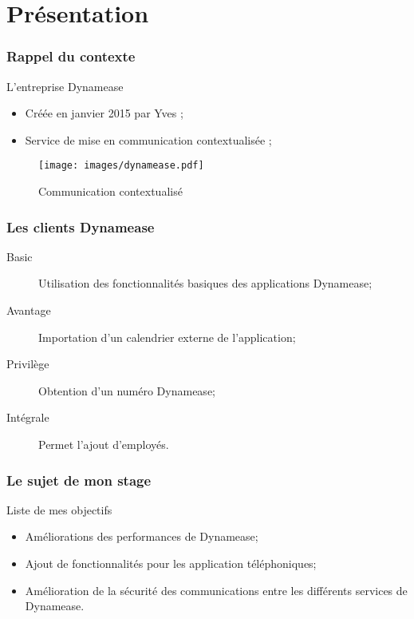 \section{Présentation}
\author{Kévin Moreau}


\begin{frame}
	\frametitle{Rappel du contexte}

	\begin{block}{L'entreprise Dynamease}
	 \begin{itemize}
      \item Créée en janvier 2015 par Yves  ;
	  \item Service de mise en communication contextualisée ;
	 \end{itemize}
	\end{block}

    \begin{center}
	  \begin{figure}
        \texttt{[image: images/dynamease.pdf]}
	   \caption{Communication contextualisé}
	  \end{figure}
	\end{center}
\end{frame}

\begin{frame}
	\frametitle{Les clients Dynamease}

    \begin{description}
    	\item[Basic] Utilisation des fonctionnalités basiques des applications Dynamease;
    	\item[Avantage] Importation d'un calendrier externe de l'application;
    	\item[Privilège] Obtention d'un numéro Dynamease;
    	\item[Intégrale] Permet l'ajout d'employés.
    \end{description}

\end{frame}

\begin{frame}
	\frametitle{Le sujet de mon stage}

	\begin{block}{Liste de mes objectifs}
	 \begin{itemize}
	  \item Améliorations des performances de Dynamease;
      \item Ajout de fonctionnalités pour les application téléphoniques;
	  \item Amélioration de la sécurité des communications entre les différents services de Dynamease.
	 \end{itemize}
	\end{block}

\end{frame}

